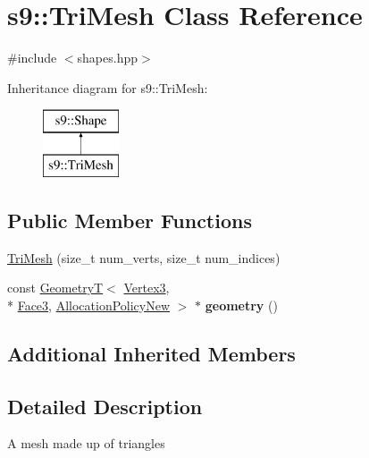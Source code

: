 \hypertarget{classs9_1_1TriMesh}{\section{s9\-:\-:Tri\-Mesh Class Reference}
\label{classs9_1_1TriMesh}
}


{\ttfamily \#include $<$shapes.\-hpp$>$}

Inheritance diagram for s9\-:\-:Tri\-Mesh\-:\begin{figure}[H]
\begin{center}
\leavevmode
\includegraphics[height=2.000000cm]{classs9_1_1TriMesh}
\end{center}
\end{figure}
\subsection*{Public Member Functions}
\begin{DoxyCompactItemize}
\item 
\hyperlink{classs9_1_1TriMesh_aabe23fe57e07be95349f24b7496a017b}{Tri\-Mesh} (size\-\_\-t num\-\_\-verts, size\-\_\-t num\-\_\-indices)
\item 
\hypertarget{classs9_1_1TriMesh_a645d3bf93a76d9e3d1bcbb85f898f4c4}{const \hyperlink{classs9_1_1GeometryT}{Geometry\-T}$<$ \hyperlink{structs9_1_1VertexT}{Vertex3}, \\*
\hyperlink{structs9_1_1FaceT}{Face3}, \hyperlink{classs9_1_1AllocationPolicyNew}{Allocation\-Policy\-New} $>$ $\ast$ {\bfseries geometry} ()}\label{classs9_1_1TriMesh_a645d3bf93a76d9e3d1bcbb85f898f4c4}

\end{DoxyCompactItemize}
\subsection*{Additional Inherited Members}


\subsection{Detailed Description}
A mesh made up of triangles 

